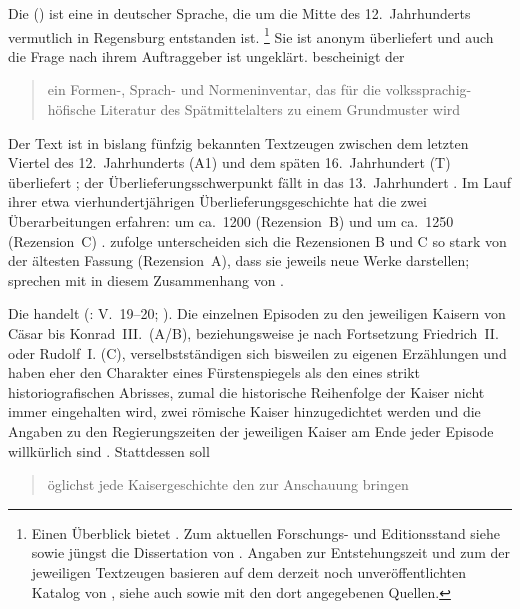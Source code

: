 Die  (\KC{}) ist eine  in deutscher
Sprache, die um die Mitte des 12.~Jahrhunderts vermutlich in Regensburg
entstanden ist.%
%
	\footnote{Einen Überblick bietet \citet{nellmann1983}. Zum aktuellen
		Forschungs- und Editionsstand siehe
		\citet{chincaetal2019a} sowie jüngst die Dissertation von
		\citet{weis2022}. Angaben zur Entstehungszeit und zum
		 der jeweiligen Textzeugen basieren auf dem derzeit
		noch unveröffentlichten Katalog von \citet{wolf:kckat}, siehe auch
		\nocite{kcdigital} sowie
		\citet[s.\,v.~]{hsc} mit den dort angegebenen
		Quellen.}
%
Sie ist anonym überliefert und auch die Frage nach ihrem Auftraggeber ist
ungeklärt. \citet[92]{wolf2008} bescheinigt der \KC{}
\blockquote{ein Formen-, Sprach- und Normeninventar, das für die
volks\-sprachig-höfische Literatur des Spätmittelalters zu einem Grundmuster
wird}.

Der Text ist in bislang fünfzig bekannten Textzeugen zwischen dem letzten
Viertel des 12.~Jahrhunderts (A1) und dem späten 16.~Jahrhundert (T)
überliefert \autocite[39, 57]{wolf:kckat}; der
Überlieferungsschwerpunkt fällt in das 13.~Jahrhundert
\autocites[vgl.][s.\,v.~]{hsc}{kcdigital}. Im Lauf ihrer
etwa vierhundertjährigen Überlieferungsgeschichte hat die \KC{} zwei
Überarbeitungen erfahren: um ca.~1200 (Rezension~B) und um ca.~1250
(Rezension~C) \autocites{wolf2008}. \citet[369]{gaertner1995} zufolge
unterscheiden sich die Rezensionen B und C so stark von der ältesten Fassung
(Rezension~A), dass sie jeweils neue Werke darstellen;
\citet[142]{chincaetal2019a} sprechen mit \citet{bumkepeters2005} in diesem
Zusammenhang von .

Die \KC{} handelt   (\KC: V.~19--20; \cite[79]{schroeder1895}). Die einzelnen Episoden
zu den jeweiligen Kaisern von Cäsar bis Konrad~III.\ (A/B), beziehungsweise je
nach Fortsetzung Friedrich~II. oder Rudolf~I. (C), verselbstständigen sich
bisweilen zu eigenen Erzählungen und haben eher den Charakter eines
Fürstenspiegels als den eines strikt historiografischen
Abrisses, zumal die historische Reihenfolge der Kaiser nicht immer eingehalten
wird, zwei römische Kaiser hinzugedichtet werden und die Angaben zu den
Regierungszeiten der jeweiligen Kaiser am Ende jeder Episode willkürlich sind
\autocite[954--960]{nellmann1983}. Stattdessen soll
\blockcquote[957]{nellmann1983}{öglichst jede Kaisergeschichte
\textelp{} den  \textelp{} zur Anschauung bringen}.


